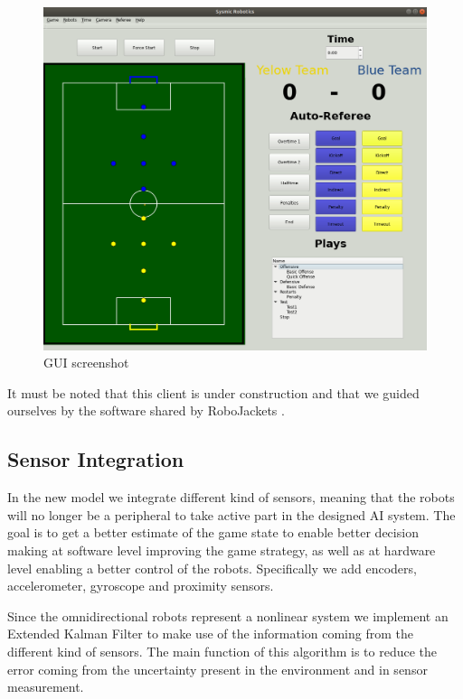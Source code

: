 \documentclass{llncs}
\begin{document}
\begin{figure}[h]
    \centering
    \includegraphics[scale=0.4]{GUI_F.png}
    \caption{GUI screenshot}
    \label{fig:GUI}
\end{figure}

It must be noted that this client is under construction and that we guided ourselves by the software shared by RoboJackets \cite{robojackets}. 

\subsection{Sensor Integration}
In the new model we integrate different kind of sensors, meaning that the robots will no longer be a peripheral to take active part in the designed AI system. The goal is to get a better estimate of the game state to enable better decision making at software level improving the game strategy, as well as at hardware level enabling a better control of the robots. Specifically we add encoders, accelerometer, gyroscope and proximity sensors.

Since the omnidirectional robots represent a nonlinear system we implement an Extended Kalman Filter  to make use of the information coming from the different kind of sensors. The main function of this algorithm is to reduce the error coming from the uncertainty present in the environment and in sensor measurement.
\end{document}
